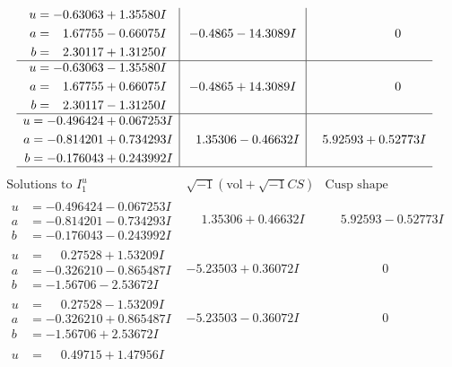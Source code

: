 \documentclass[1p]{elsarticle_modified}
\theoremstyle{definition}
\newcommand{\I}{\sqrt{-1}}
\begin{document}
$$\begin{array}{c|c|c}
\begin{aligned}
u &= -0.63063 + 1.35580 I \\
a &= \phantom{-}1.67755 - 0.66075 I \\
b &= \phantom{-}2.30117 + 1.31250 I\end{aligned}
 & -0.4865 - 14.3089 I & \phantom{-0.000000 } 0 \\ \hline\begin{aligned}
u &= -0.63063 - 1.35580 I \\
a &= \phantom{-}1.67755 + 0.66075 I \\
b &= \phantom{-}2.30117 - 1.31250 I\end{aligned}
 & -0.4865 + 14.3089 I & \phantom{-0.000000 } 0 \\ \hline\begin{aligned}
u &= -0.496424 + 0.067253 I \\
a &= -0.814201 + 0.734293 I \\
b &= -0.176043 + 0.243992 I\end{aligned}
 & \phantom{-}1.35306 - 0.46632 I & \phantom{-}5.92593 + 0.52773 I\\
 \hline 
 \end{array}$$\newpage$$\begin{array}{c|c|c}  
\text{Solutions to }I^u_{1}& \I (\text{vol} + \sqrt{-1}CS) & \text{Cusp shape}\\
 \hline 
\begin{aligned}
u &= -0.496424 - 0.067253 I \\
a &= -0.814201 - 0.734293 I \\
b &= -0.176043 - 0.243992 I\end{aligned}
 & \phantom{-}1.35306 + 0.46632 I & \phantom{-}5.92593 - 0.52773 I \\ \hline\begin{aligned}
u &= \phantom{-}0.27528 + 1.53209 I \\
a &= -0.326210 - 0.865487 I \\
b &= -1.56706 - 2.53672 I\end{aligned}
 & -5.23503 + 0.36072 I & \phantom{-0.000000 } 0 \\ \hline\begin{aligned}
u &= \phantom{-}0.27528 - 1.53209 I \\
a &= -0.326210 + 0.865487 I \\
b &= -1.56706 + 2.53672 I\end{aligned}
 & -5.23503 - 0.36072 I & \phantom{-0.000000 } 0 \\ \hline\begin{aligned}
u &= \phantom{-}0.49715 + 1.47956 I \\

\end{aligned}
\end{array}$$
\end{document}
